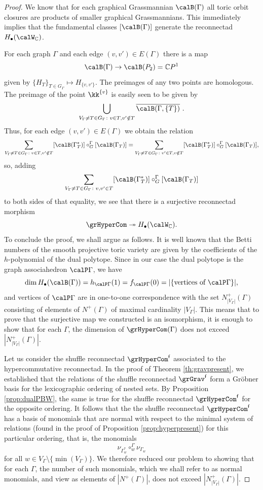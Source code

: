 \begin{proof}
We know that for each graphical Grassmannian $\calB(\Gamma)$ all toric orbit closures are products of smaller graphical Grassmannians. This immediately implies that the fundamental classes $[\calB(\Gamma)]$ generate the reconnectad $H_{\bullet}(\calW_{\mathbb{C}})$. 

For each graph $\Gamma$ and each edge $(v,v')\in E(\Gamma)$ there is a map 
 \[
\calB(\Gamma)\to \calB(P_2)=\mathbb{C}P^1
 \] 
given by $\{H_T\}_{T\in G_\Gamma}\mapsto H_{\{v,v'\}}$. The preimages of any two points are homologous. The preimage of the point $\kk^{\{v\}}$ is easily seen to be given by 
    \[
\bigcup_{V_\Gamma\ne T\in G_\Gamma\colon v\in T, v'\notin T} \overline{\calB(\Gamma,\{T\})} \ .  
    \]
Thus, for each edge $(v,v')\in E(\Gamma)$ we obtain the relation
 \[
\sum_{V_\Gamma\ne T\in G_\Gamma\colon v \in T, v'\notin T} [\calB(\Gamma^*_T)]\circ_G^{\Gamma} [\calB(\Gamma_T)]= 
\sum_{V_\Gamma\ne T\in G_\Gamma\colon v'\in T, v \notin T} [\calB(\Gamma^*_T)]\circ_G^{\Gamma} [\calB(\Gamma_T)],
 \]
so, adding 
 \[
\sum_{V_\Gamma\ne T\in G_\Gamma\colon v,v' \in T} [\calB(\Gamma^*_T)]\circ_G^{\Gamma} [\calB(\Gamma_T)]
 \]
to both sides of that equality, we see that there is a surjective reconnectad morphism
 \[
\grHyperCom\twoheadrightarrow H_{\bullet}(\calW_{\mathbb{C}}).
 \]
To conclude the proof, we shall argue as follows. It is well known that the Betti numbers of the smooth projective toric variety are given by the coefficients of the $h$-polynomial of the dual polytope. Since in our case the dual polytope is the graph associahedron $\calP\Gamma$, we have
 \[
\dim H_{\bullet}(\calB(\Gamma))=h_{\calP\Gamma}(1)=f_{\calP\Gamma}(0)=|\{\text{vertices of } \calP\Gamma\}|,
 \] 
and vertices of $\calP\Gamma$ are in one-to-one correspondence with the set $N^+_{|V_\Gamma|}(\Gamma)$ consisting of elements of $N^+(\Gamma)$ of maximal cardinality $|V_\Gamma|$. This means that to prove that the surjective map we constructed is an isomorphism, it is enough to show that for each $\Gamma$, the dimension of $\grHyperCom(\Gamma)$ does not exceed $|N^+_{|V_\Gamma|}(\Gamma)|$.

Let us consider the shuffle reconnectad $\grHyperCom^{\mathsf{f}}$ associated to the hypercommutative reconnectad. In the proof of Theorem \ref{th:gravpresent}, we established that the relations of the shuffle reconnectad $\grGrav^{\mathsf{f}}$ form a Gr\"obner basis for the lexicographic ordering of nested sets. By Proposition \ref{prop:dualPBW}, the same is true for the shuffle reconnectad $\grHyperCom^{\mathsf{f}}$ for the opposite ordering. It follows that the the shuffle reconnectad $\grHyperCom^{\mathsf{f}}$ has a basis of monomials that are
normal with respect to the minimal system of relations (found in the proof of Proposition \ref{prop:hyperpresent}) for this particular ordering, that is, the monomials 
 \[
\nu_{\Gamma_w^*}\circ_w^{\Gamma}\nu_{\Gamma_w}
 \]
for all $w\in V_\Gamma\setminus\{\min(V_\Gamma)\}$. We therefore reduced our problem to showing that for each $\Gamma$, the number of such monomials, which we shall refer to as normal monomials, and view as elements of $|N^+(\Gamma)|$, does not exceed $|N^+_{|V_\Gamma|}(\Gamma)|$.


\end{proof}
